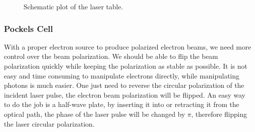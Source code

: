 \begin{figure}[h!]
    \caption{Schematic plot of the laser table.}
    \label{fig:laser_table}
\end{figure}

\subsubsection{Pockels Cell}
With a proper electron source to produce polarized electron beams, we need more control 
over the beam polarization. We should be able to flip the beam polarization
quickly while keeping the polarization as stable as possible. It is not easy and time
consuming to manipulate electrons directly, while manipulating photons is much 
easier. One just need to reverse the circular polarization of the incident laser pulse,
the electron beam polarization will be flipped. An easy way to do the job is
a half-wave plate, by inserting it into or retracting it from the optical path,
the phase of the laser pulse will be changed by $\pi$, therefore flipping the laser
circular polarization. 

